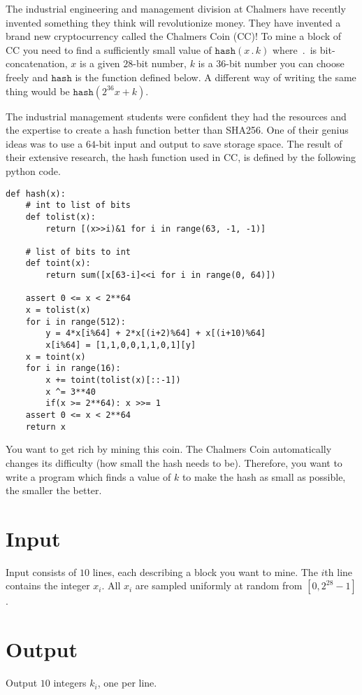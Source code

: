 The industrial engineering and management division at Chalmers have recently
invented something they think will revolutionize money. They have invented a
brand new cryptocurrency called the Chalmers Coin (CC)! To mine a block of CC
you need to find a sufficiently small value of $\texttt{hash}(x \,.\, k)$ where
$\,.\,$ is bit-concatenation, $x$ is a given $28$-bit number, $k$ is a $36$-bit
number you can choose freely and $\texttt{hash}$ is the function defined below.
A different way of writing the same thing would be $\texttt{hash}(2^{36} x +
k)$.

The industrial management students were confident they had the resources and the
expertise to create a hash function better than SHA256. One of their genius
ideas was to use a $64$-bit input and output to save storage space. The result
of their extensive research, the hash function used in CC, is defined by the
following python code.

\begin{verbatim}
def hash(x):
    # int to list of bits
    def tolist(x):
        return [(x>>i)&1 for i in range(63, -1, -1)]

    # list of bits to int
    def toint(x):
        return sum([x[63-i]<<i for i in range(0, 64)])

    assert 0 <= x < 2**64
    x = tolist(x)
    for i in range(512):
        y = 4*x[i%64] + 2*x[(i+2)%64] + x[(i+10)%64]
        x[i%64] = [1,1,0,0,1,1,0,1][y]
    x = toint(x)
    for i in range(16):
        x += toint(tolist(x)[::-1])
        x ^= 3**40
        if(x >= 2**64): x >>= 1
    assert 0 <= x < 2**64
    return x
\end{verbatim}

\noindent You want to get rich by mining this coin. The Chalmers Coin
automatically changes its difficulty (how small the hash needs to be).
Therefore, you want to write a program which finds a value of $k$ to make the
hash as small as possible, the smaller the better.

\section*{Input}
Input consists of $10$ lines, each describing a block you want to mine. The
$i$th line contains the integer $x_i$. All $x_i$ are sampled uniformly at random
from $[0, 2^{28}-1]$.

\section*{Output}
Output $10$ integers $k_i$, one per line.

